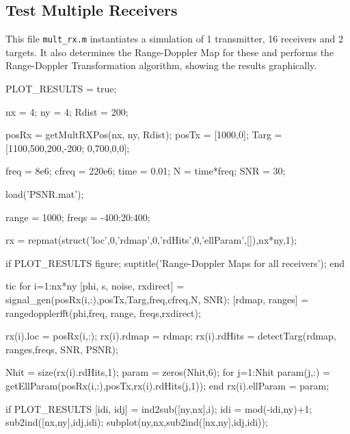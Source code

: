 \documentclass[12pt,openany,a4paper]{book}
\begin{document}
\subsection{Test Multiple Receivers}
This file \verb+mult_rx.m+ instantiates a simulation of 1 transmitter, 16 receivers and 2 targets. It also determines the Range-Doppler Map for these and performs the Range-Doppler Transformation algorithm, showing the results graphically.

\begin{spverbatim}

PLOT_RESULTS = true;


nx = 4; %
ny = 4; %
Rdist = 200;  %

posRx = getMultRXPos(nx, ny, Rdist);
posTx = [1000,0];
Targ = [1100,500,200,-200;
        0,700,0,0];

freq = 8e6;  %
cfreq = 220e6; %
time = 0.01; %
N = time*freq; %
SNR = 30; %

load('PSNR.mat');

range = 1000;   %
freqs = -400:20:400;

rx = repmat(struct('loc',0,'rdmap',0,'rdHits',0,'ellParam',[]),nx*ny,1);

if PLOT_RESULTS
    figure;
    suptitle('Range-Doppler Maps for all receivers');
end

tic
for i=1:nx*ny
    [phi, s, noise, rxdirect] = signal_gen(posRx(i,:),posTx,Targ,freq,cfreq,N, SNR);
    [rdmap, ranges] = rangedopplerfft(phi,freq, range, freqs,rxdirect);
    
    rx(i).loc = posRx(i,:);
    rx(i).rdmap = rdmap;
    rx(i).rdHits = detectTarg(rdmap, ranges,freqs, SNR, PSNR);
    
    Nhit = size(rx(i).rdHits,1);
    param = zeros(Nhit,6);
    for j=1:Nhit
        param(j,:) = getEllParam(posRx(i,:),posTx,rx(i).rdHits(j,1));
    end
    rx(i).ellParam = param;
    
    if PLOT_RESULTS
        [idi, idj] = ind2sub([ny,nx],i);
        idi = mod(-idi,ny)+1;
        sub2ind([nx,ny],idj,idi);
        subplot(ny,nx,sub2ind([nx,ny],idj,idi));
        

\end{spverbatim}
\end{document}
